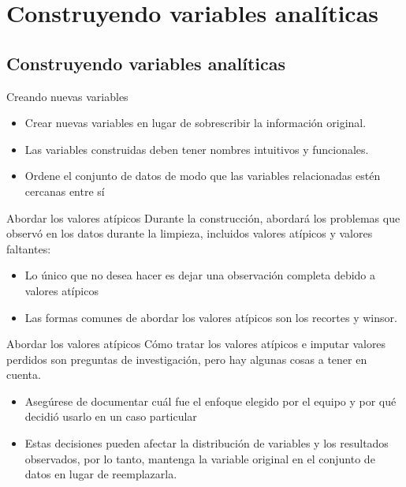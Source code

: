 \documentclass[10pt, aspectratio=169, compress]{beamer}
\begin{document}
\section{Construyendo variables analíticas}
\subsection{Construyendo variables analíticas}
\begin{frame}{Creando nuevas variables}
	\begin{itemize}
		\item Crear nuevas variables en lugar de sobrescribir la información original.
		\item Las variables construidas deben tener nombres intuitivos y funcionales.
		\item Ordene el conjunto de datos de modo que las variables relacionadas estén cercanas entre sí
	\end{itemize}
\end{frame}
\begin{frame}{Abordar los valores atípicos}
	Durante la construcción, abordará los problemas que observó en los datos durante la limpieza, incluidos valores atípicos y valores faltantes: 
	\begin{itemize}[<+->]
		\item Lo único que no desea hacer es dejar una observación completa debido a valores atípicos
		\item Las formas comunes de abordar los valores atípicos son los recortes y winsor.
	\end{itemize}
\end{frame}
\begin{frame}[<+->]{Abordar los valores atípicos}
	Cómo tratar los valores atípicos e imputar valores perdidos son preguntas de investigación, pero hay algunas cosas a tener en cuenta.
	\begin{itemize}
		\item Asegúrese de documentar cuál fue el enfoque elegido por el equipo y por qué decidió usarlo en un caso particular
		\item Estas decisiones pueden afectar la distribución de variables y los resultados observados, por lo tanto, mantenga la variable original en el conjunto de datos en lugar de reemplazarla.
	\end{itemize}
\end{frame}
\end{document}
